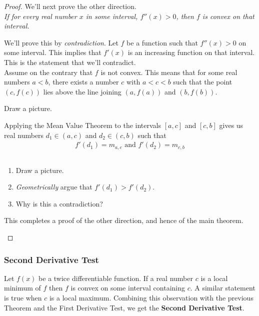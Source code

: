 \begin{proof}
	\noindent We'll next prove the other direction. \\
	 {\it If for every real number $x$ in some interval, $f''(x) > 0$, then $f$ is convex on that interval.}

	We'll prove this by {\it contradiction}. Let $f$ be a function such that $f''(x) > 0$ on some interval. This implies that $f'(x)$ is an increasing function on that interval. This is the statement that we'll contradict.\\

	Assume on the contrary that $f$ is not convex. This means that for some real numbers $a < b$, there exists a number $c$ with $a < c < b$ such that the point $(c,f(c))$ lies above the line joining $(a,f(a))$ and $(b,f(b))$.

	\begin{exercise}
		Draw a picture.
	\end{exercise}
	Applying the Mean Value Theorem to the intervals $[a,c]$ and $[c,b]$ gives us real numbers $d_1 \in (a,c)$ and $d_2 \in (c,b)$ such that
	\begin{align*}
		f'(d_1) = m_{a,c} \mbox{ and } f'(d_2) = m_{c,b}
	\end{align*}

	\begin{exercise} $ $
		\begin{enumerate}
			\item Draw a picture.
			\item {\it Geometrically} argue that $f'(d_1) > f'(d_2)$.
			\item Why is this a contradiction?
		\end{enumerate}
	This completes a proof of the other direction, and hence of the main theorem.
	\end{exercise}
\end{proof}

\subsubsection{Second Derivative Test}
Let $f(x)$ be a twice differentiable function. If a real number $c$ is a local minimum of $f$ then $f$ is convex on some interval containing $c$. A similar statement is true when $c$ is a local maximum. Combining this observation with the previous Theorem and the First Derivative Test, we get the {\bf Second Derivative Test}.

